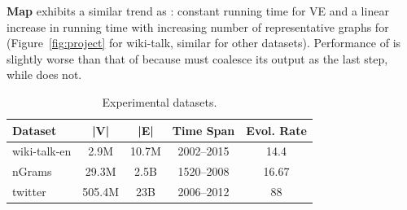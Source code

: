 {\bf Map} exhibits a similar trend
as : constant running time for VE and a linear increase
in running time with increasing number of representative graphs for
\sg (Figure~\ref{fig:project} for wiki-talk, similar for other
datasets).  Performance of  is slightly worse than that of
 because  must coalesce its output as the last
step, while  does not. 

\begin{table}
\caption{Experimental datasets.}
\vspace{-0.1in}
\small
\begin{tabular}{l | c | c | c | c }
\hline
\multicolumn{1}{l|}{\bfseries Dataset} & \multicolumn{1}{c|}{\bfseries |V|} & \multicolumn{1}{c|}{\bfseries |E|} & \multicolumn{1}{c|}{\bfseries Time Span} & \multicolumn{1}{c}{\bfseries Evol. Rate} \\ \hline
wiki-talk-en & 2.9M & 10.7M & 2002--2015 & 14.4 \\ \hline
nGrams & 29.3M & 2.5B & 1520--2008 & 16.67 \\ \hline
twitter & 505.4M & 23B & 2006--2012 & 88 \\ \hline
\end{tabular}
\vspace{-0.1cm}
\label{tab:datasets}
\end{table}

